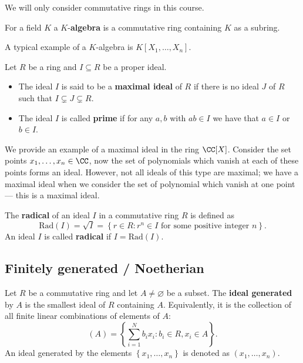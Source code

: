 \documentclass[12pt, a4paper]{article}
\begin{document}
\begin{mdremark}
    We will only consider commutative rings in this course.
\end{mdremark}

\begin{definition}
    For a field \(K\) a \(K\)-\textbf{algebra} is a commutative ring containing \(K\) as a subring.
\end{definition}

\begin{mdexample}
    A typical example of a \(K\)-algebra is \(K[X_1,\ldots,X_n]\).
\end{mdexample}

\begin{definition}
    Let \(R\) be a ring and \(I \subseteq R\) be a proper ideal.
    \begin{itemize}
        \item The ideal \(I\) is said to be a \textbf{maximal ideal} of \(R\) if there is no ideal \(J\) of \(R\) such that \(I \subsetneq J \subsetneq R\).
        \item The ideal \(I\) is called \textbf{prime} if for any \(a,b\) with \(ab \in I\) we have that \(a \in I\) or \(b \in I\).
    \end{itemize}
\end{definition}

\begin{mdexample}
    We provide an example of a maximal ideal in the ring \(\CC[X]\). Consider the set points \(x_1,\ldots,x_n \in \CC\), now the set of polynomials which vanish at each of these points forms an ideal. However, not all ideals of this type are maximal; we have a maximal ideal when we consider the set of polynomial which vanish at one point --- this is a maximal ideal.
\end{mdexample}

\begin{definition}
    The \textbf{radical} of an ideal \(I\) in a commutative ring \(R\) is defined as 
    \[\text{Rad}(I) = \sqrt{I} =\left\{ r\in R : r^n \in I \text{ for some positive integer } n \right\}.\]
    An ideal \(I\) is called \textbf{radical} if \(I = \text{Rad}(I).\)
\end{definition}

\subsection{Finitely generated / Noetherian}

\begin{definition}
    Let \(R\) be a commutative ring and let \(A \neq \varnothing\) be a subset. The \textbf{ideal generated} by \(A\) is the smallest ideal of \(R\) containing \(A\). Equivalently, it is the collection of all finite linear combinations of elements of \(A\): 
    \[ (A) =\left\{ \sum_{i=1}^N b_ix_i : b_i \in R, x_i \in A \right\}.\]
    An ideal generated by the elements \(\left\{ x_1,\ldots,x_n \right\}\) is denoted as \((x_1,\ldots,x_n)\).
\end{definition}
\end{document}
